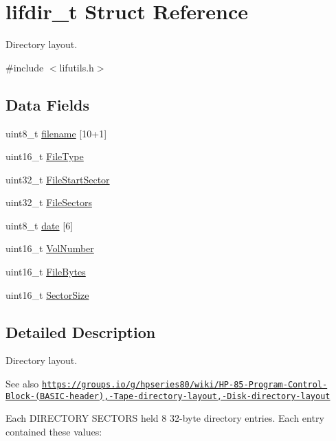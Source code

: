 \hypertarget{structlifdir__t}{}\section{lifdir\+\_\+t Struct Reference}
\label{structlifdir__t}


Directory layout.  




{\ttfamily \#include $<$lifutils.\+h$>$}

\subsection*{Data Fields}
\begin{DoxyCompactItemize}
\item 
uint8\+\_\+t \hyperlink{structlifdir__t_a700fd2eb77539353ba670b76d9acb29d}{filename} \mbox{[}10+1\mbox{]}
\item 
uint16\+\_\+t \hyperlink{structlifdir__t_a7a93a706ac4bb88f65826619c9b02231}{File\+Type}
\item 
uint32\+\_\+t \hyperlink{structlifdir__t_ac17bb6f653b05078f5fc8112c21286f2}{File\+Start\+Sector}
\item 
uint32\+\_\+t \hyperlink{structlifdir__t_a92382e062294ebdc632c6c78dcd397aa}{File\+Sectors}
\item 
uint8\+\_\+t \hyperlink{structlifdir__t_afb6d03670642d3bf86f460ae246ceb0b}{date} \mbox{[}6\mbox{]}
\item 
uint16\+\_\+t \hyperlink{structlifdir__t_a30c6a4231c58d2d43dc31e06bda5a687}{Vol\+Number}
\item 
uint16\+\_\+t \hyperlink{structlifdir__t_a6e2414bf7966358862b59c5eaf3903f2}{File\+Bytes}
\item 
uint16\+\_\+t \hyperlink{structlifdir__t_adf3c38eecddce15925157383ff38ef2d}{Sector\+Size}
\end{DoxyCompactItemize}


\subsection{Detailed Description}
Directory layout. 

\begin{DoxySeeAlso}{See also}
\href{https://groups.io/g/hpseries80/wiki/HP-85-Program-Control-Block-(BASIC-header),-Tape-directory-layout,-Disk-directory-layout}{\tt https\+://groups.\+io/g/hpseries80/wiki/\+H\+P-\/85-\/\+Program-\/\+Control-\/\+Block-\/(\+B\+A\+S\+I\+C-\/header),-\/\+Tape-\/directory-\/layout,-\/\+Disk-\/directory-\/layout}
\end{DoxySeeAlso}
Each D\+I\+R\+E\+C\+T\+O\+RY S\+E\+C\+T\+O\+RS held 8 32-\/byte directory entries. Each entry contained these values\+:

